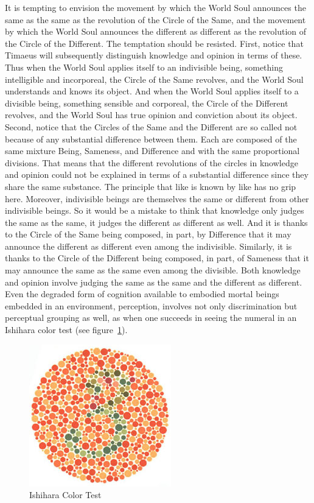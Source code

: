 It is tempting to envision the movement by which the World Soul announces the same as the same as the revolution of the Circle of the Same, and the movement by which the World Soul announces the different as different as the revolution of the Circle of the Different. The temptation should be resisted. First, notice that Timaeus will subsequently distinguish knowledge and opinion in terms of these. Thus when the World Soul applies itself to an indivisible being, something intelligible and incorporeal, the Circle of the Same revolves, and the World Soul understands and knows its object. And when the World Soul applies itself to a divisible being, something sensible and corporeal, the Circle of the Different revolves, and the World Soul has true opinion and conviction about its object. Second, notice that the Circles of the Same and the Different are so called not because of any substantial difference between them. Each are composed of the same mixture Being, Sameness, and Difference and with the same proportional divisions. That means that the different revolutions of the circles in knowledge and opinion could not be explained in terms of a substantial difference since they share the same substance. The principle that like is known by like has no grip here. Moreover, indivisible beings are themselves the same or different from other indivisible beings. So it would be a mistake to think that knowledge only judges the same as the same, it judges the different as different as well. And it is thanks to the Circle of the Same being composed, in part, by Difference that it may announce the different as different even among the indivisible. Similarly, it is thanks to the Circle of the Different being composed, in part, of Sameness that it may announce the same as the same even among the divisible. Both knowledge and opinion involve judging the same as the same and the different as different. Even the degraded form of cognition available to embodied mortal beings embedded in an environment, perception, involves not only discrimination but perceptual grouping as well, as when one succeeds in seeing the numeral in an Ishihara color test (see figure~\ref{fig:ishihara}).

\begin{figure}[htbp]
	\centering
		\includegraphics[scale=1.5]{graphics/ishihara.jpg}
	\caption{Ishihara Color Test}
	\label{fig:ishihara}
\end{figure}


